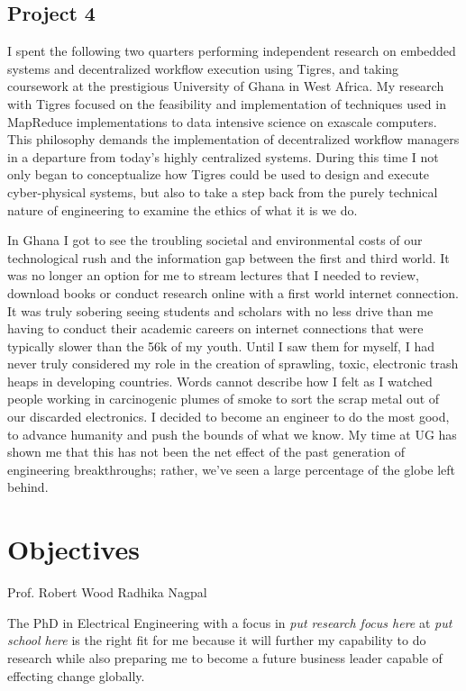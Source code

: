 \documentclass[journal, draftcls]{IEEEtran}
\begin{document}
\subsection{Project 4}
 I spent the following two quarters performing independent research on embedded systems and decentralized workflow execution using Tigres, and taking coursework at the prestigious University of Ghana in West Africa. My research with Tigres  focused on the feasibility and implementation of techniques used in MapReduce implementations to data intensive science on exascale computers. This philosophy demands the implementation of decentralized workflow managers in a departure from today's highly centralized systems. During this time I not only began to conceptualize how Tigres could be used to design and execute cyber-physical systems, but also to take a step back from the purely technical nature of engineering to examine the ethics of what it is we do. 
 
 In Ghana I got to see the troubling societal and environmental costs of our technological rush and the information gap between the first and third world. It was no longer an option for me to stream lectures that I needed to review, download books or conduct research online with a first world internet connection. It was truly sobering seeing students and scholars with no less drive than me having to conduct their academic careers on internet connections that were typically slower than the 56k of my youth. Until I saw them for myself, I had never truly considered my role in the creation of sprawling, toxic, electronic trash heaps in developing countries. Words cannot describe how I felt as I watched people working in carcinogenic plumes of smoke to sort the scrap metal out of our discarded electronics. I decided to become an engineer to do the most good, to advance humanity and push the bounds of what we know. My time at UG has shown me that this has not been the net effect of the past generation of engineering breakthroughs; rather, we've seen a large percentage of the globe left behind. 

\section{Objectives}
Prof. Robert Wood
Radhika Nagpal
	
The PhD in Electrical Engineering with a focus in \textit{{put research focus here}} at \textit{{put school here}} is the right fit for me because it will further my capability to do research while also preparing me to become a future business leader capable of effecting change globally. 
\end{document}
